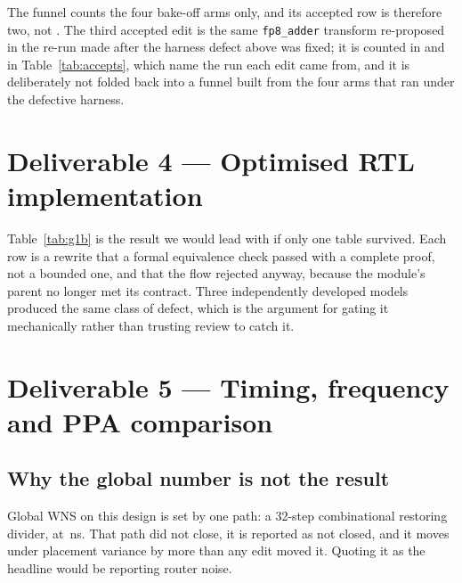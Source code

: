 \documentclass[11pt,a4paper]{article}
\begin{document}
The funnel counts the four bake-off arms only, and its accepted row is
therefore two, not \numaccepted. The third accepted edit is the same
\texttt{fp8\_adder} transform re-proposed in the re-run made after the harness
defect above was fixed; it is counted in \numaccepted{} and in
Table~\ref{tab:accepts}, which name the run each edit came from, and it is
deliberately not folded back into a funnel built from the four arms that ran
under the defective harness.

\section{Deliverable 4 --- Optimised RTL implementation}
\label{sec:d4}





Table~\ref{tab:g1b} is the result we would lead with if only one table
survived. Each row is a rewrite that a formal equivalence check passed with a complete
proof, not a bounded one, and that the flow rejected anyway,
because the module's parent no longer met its contract. Three independently
developed models produced the same class of defect, which is the argument for
gating it mechanically rather than trusting review to catch it.

\section{Deliverable 5 --- Timing, frequency and PPA comparison}
\label{sec:d5}



\subsection{Why the global number is not the result}

Global WNS on this design is set by one path: a 32-step combinational restoring
divider, at \baselinewns\,ns. That path did not close, it is reported as not
closed, and it moves under placement variance by more than any edit moved it.
Quoting it as the headline would be reporting router noise.




\end{document}
